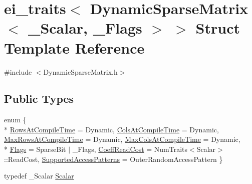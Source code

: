 \hypertarget{structei__traits_3_01_dynamic_sparse_matrix_3_01___scalar_00_01___flags_01_4_01_4}{\section{ei\-\_\-traits$<$ Dynamic\-Sparse\-Matrix$<$ \-\_\-\-Scalar, \-\_\-\-Flags $>$ $>$ Struct Template Reference}
\label{structei__traits_3_01_dynamic_sparse_matrix_3_01___scalar_00_01___flags_01_4_01_4}
}


{\ttfamily \#include $<$Dynamic\-Sparse\-Matrix.\-h$>$}

\subsection*{Public Types}
\begin{DoxyCompactItemize}
\item 
enum \{ \\*
\hyperlink{structei__traits_3_01_dynamic_sparse_matrix_3_01___scalar_00_01___flags_01_4_01_4_a25d3e0b70f7830034996224a23bf9bfca661d9b245c771bb26faab9b8caba5def}{Rows\-At\-Compile\-Time} = Dynamic, 
\hyperlink{structei__traits_3_01_dynamic_sparse_matrix_3_01___scalar_00_01___flags_01_4_01_4_a25d3e0b70f7830034996224a23bf9bfca8f55cd1c0c54e01c60215c22fa7eac59}{Cols\-At\-Compile\-Time} = Dynamic, 
\hyperlink{structei__traits_3_01_dynamic_sparse_matrix_3_01___scalar_00_01___flags_01_4_01_4_a25d3e0b70f7830034996224a23bf9bfca51861798361bffcecf1acedd0f390612}{Max\-Rows\-At\-Compile\-Time} = Dynamic, 
\hyperlink{structei__traits_3_01_dynamic_sparse_matrix_3_01___scalar_00_01___flags_01_4_01_4_a25d3e0b70f7830034996224a23bf9bfcaade3ec3c0f19cdda4adc7b3a0bbbddc7}{Max\-Cols\-At\-Compile\-Time} = Dynamic, 
\\*
\hyperlink{structei__traits_3_01_dynamic_sparse_matrix_3_01___scalar_00_01___flags_01_4_01_4_a25d3e0b70f7830034996224a23bf9bfcae988c67f8832db540d74761b08bf3ed0}{Flags} = Sparse\-Bit $|$ \-\_\-\-Flags, 
\hyperlink{structei__traits_3_01_dynamic_sparse_matrix_3_01___scalar_00_01___flags_01_4_01_4_a25d3e0b70f7830034996224a23bf9bfcac7dadba4b5624aaa667c12d831e45ae4}{Coeff\-Read\-Cost} = Num\-Traits$<$Scalar$>$\-:\-:Read\-Cost, 
\hyperlink{structei__traits_3_01_dynamic_sparse_matrix_3_01___scalar_00_01___flags_01_4_01_4_a25d3e0b70f7830034996224a23bf9bfcaf78087f02ab12247a0aed364d054e610}{Supported\-Access\-Patterns} = Outer\-Random\-Access\-Pattern
 \}
\item 
typedef \-\_\-\-Scalar \hyperlink{structei__traits_3_01_dynamic_sparse_matrix_3_01___scalar_00_01___flags_01_4_01_4_a26ea3b7bf14931d326be11ead462c02f}{Scalar}
\end{DoxyCompactItemize}


